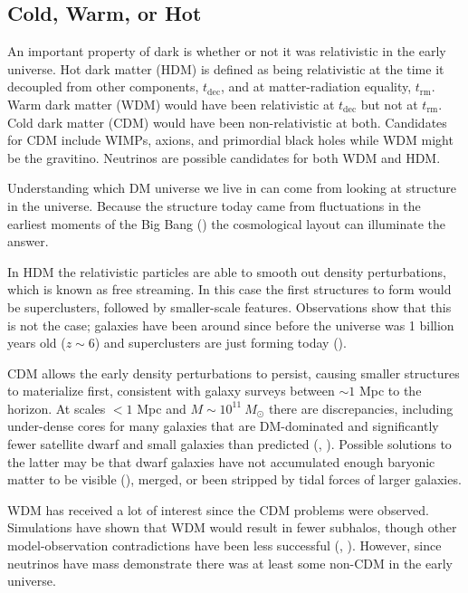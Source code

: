 \subsection{Cold, Warm, or Hot} \label{subsec:hot_vs_cold}
An important property of dark is whether or not it was relativistic in the early universe.  Hot dark matter (HDM)
is defined as being relativistic at the time it decoupled from other components, $t_{\mathrm{dec}}$, and at
matter-radiation equality, $t_{\mathrm{rm}}$.  Warm dark matter (WDM) would have been relativistic at $t_{\mathrm{dec}}$
but not at $t_{\mathrm{rm}}$.  Cold dark matter (CDM) would have been non-relativistic at both.  Candidates for CDM include
WIMPs, axions, and primordial black holes while WDM might be the gravitino.  Neutrinos are possible candidates for both
WDM and HDM.

Understanding which DM universe we live in can come from looking at structure in the universe.  Because the structure
today came from fluctuations in the earliest moments of the Big Bang () the cosmological layout
can illuminate the answer.

In HDM the relativistic particles are able to smooth out density perturbations, which is known as free
streaming.  In this case the first structures to form would be superclusters, followed by smaller-scale
features.  Observations show that this is not the case; galaxies have been around since before the universe
was 1 billion years old ($z \sim 6$) and superclusters are just forming today ().

CDM allows the early density perturbations to persist, causing smaller structures to materialize first,
consistent with galaxy surveys between $\sim 1$ Mpc to the horizon.  At scales $< 1$ Mpc and
$M \sim 10^{11} \ M_{\odot}$ there are discrepancies, including under-dense cores for many galaxies that are DM-dominated
and significantly fewer satellite dwarf and small galaxies than predicted (, ).  Possible
solutions to the latter may be that dwarf galaxies have not accumulated enough baryonic matter to be visible
(), merged, or been stripped by tidal forces of larger galaxies.

WDM has received a lot of interest since the CDM problems were observed.  Simulations have shown that
WDM would result in fewer subhalos, though other model-observation contradictions have been less
successful (, ).  However, since neutrinos have mass demonstrate there
was at least some non-CDM in the early universe.

